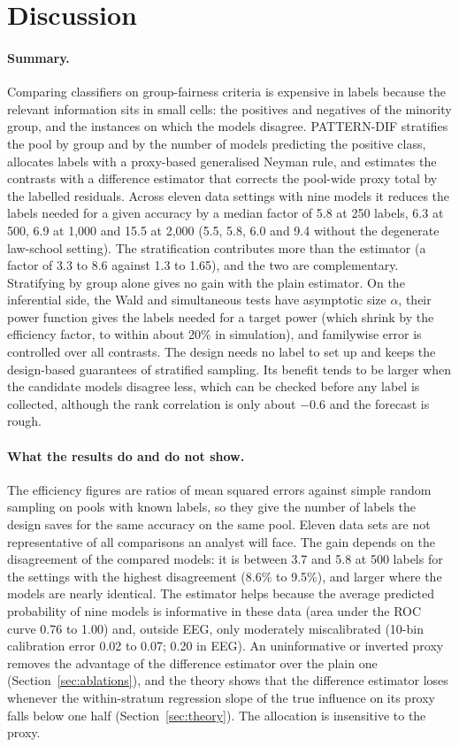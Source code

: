 \section{Discussion}\label{sec:discussion}

\paragraph{Summary.} Comparing classifiers on group-fairness criteria is expensive in labels because the relevant information sits in small cells: the positives and negatives of the minority group, and the instances on which the models disagree. PATTERN-DIF stratifies the pool by group and by the number of models predicting the positive class, allocates labels with a proxy-based generalised Neyman rule, and estimates the contrasts with a difference estimator that corrects the pool-wide proxy total by the labelled residuals. Across eleven data settings with nine models it reduces the labels needed for a given accuracy by a median factor of 5.8 at 250 labels, 6.3 at 500, 6.9 at 1,000 and 15.5 at 2,000 (5.5, 5.8, 6.0 and 9.4 without the degenerate law-school setting). The stratification contributes more than the estimator (a factor of 3.3 to 8.6 against 1.3 to 1.65), and the two are complementary. Stratifying by group alone gives no gain with the plain estimator. On the inferential side, the Wald and simultaneous tests have asymptotic size $\alpha$, their power function gives the labels needed for a target power (which shrink by the efficiency factor, to within about 20\% in simulation), and familywise error is controlled over all contrasts. The design needs no label to set up and keeps the design-based guarantees of stratified sampling. Its benefit tends to be larger when the candidate models disagree less, which can be checked before any label is collected, although the rank correlation is only about $-0.6$ and the forecast is rough.

\paragraph{What the results do and do not show.} The efficiency figures are ratios of mean squared errors against simple random sampling on pools with known labels, so they give the number of labels the design saves for the same accuracy on the same pool. Eleven data sets are not representative of all comparisons an analyst will face. The gain depends on the disagreement of the compared models: it is between 3.7 and 5.8 at 500 labels for the settings with the highest disagreement (8.6\% to 9.5\%), and larger where the models are nearly identical. The estimator helps because the average predicted probability of nine models is informative in these data (area under the ROC curve 0.76 to 1.00) and, outside EEG, only moderately miscalibrated (10-bin calibration error 0.02 to 0.07; 0.20 in EEG). An uninformative or inverted proxy removes the advantage of the difference estimator over the plain one (Section~\ref{sec:ablations}), and the theory shows that the difference estimator loses whenever the within-stratum regression slope of the true influence on its proxy falls below one half (Section~\ref{sec:theory}). The allocation is insensitive to the proxy.

